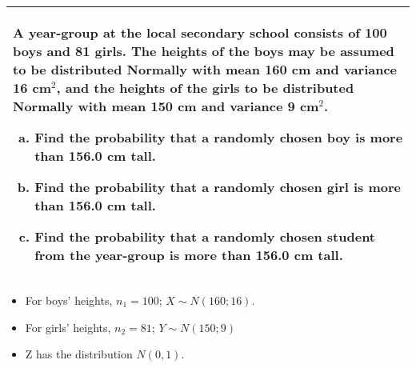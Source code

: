 \documentclass[a4paper,12pt]{article}
\begin{document}
\large
  \begin{table}[ht!]
  \centering
  \begin{tabular}{|p{15cm}|}
  \hline \large
A year-group at the local secondary school consists of 100 boys and 81 girls.  The heights of the boys may be assumed to be distributed Normally with mean 160 cm and variance 16 cm$^2$, and the heights of the girls to be distributed Normally with mean 150 cm and variance 9 cm$^2$. 
 \smallskip
\begin{enumerate}[(a)]
\item Find the probability that a randomly chosen boy is more than 156.0 cm tall.
\item Find the probability that a randomly chosen girl is more than 156.0 cm tall.
\item Find the probability that a randomly chosen student from the year-group is more than 156.0 cm tall. 
\end{enumerate} \\

  \hline
   \end{tabular}
 \end{table}
 
 \begin{itemize}
 \item For boys’ heights, $n_1 = 100$; $X \sim N(160; 16)$.
 \item For girls’ heights, $n_2 = 81$; $Y \sim N(150; 9)$ 
 \item Z has the distribution $N(0,1)$. 
 \end{itemize}
\end{document}
